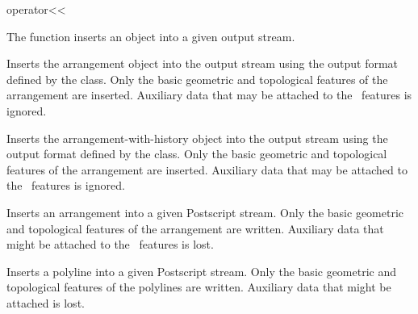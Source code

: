 \ccHtmlNoClassLinks
\begin{ccRefFunction}{operator<<}
\label{ref_arr_operator_leftshift}

\ccDefinition

The function \ccRefName{} inserts an object into a given output stream.



Inserts the arrangement object  into the output stream
 using the output format defined by the
 class. Only the basic geometric and
topological features of the arrangement are inserted. Auxiliary data
that may be attached to the \dcel\ features is ignored.



Inserts the arrangement-with-history object  into the output
stream  using the output format defined by the
 class. Only the basic geometric
and topological features of the arrangement are inserted. Auxiliary
data that may be attached to the \dcel\ features is ignored.


Inserts an arrangement into a given Postscript stream.
Only the basic geometric and topological features of the arrangement are
written. Auxiliary data that might be attached to the \dcel\ features is
lost.




Inserts a polyline into a given Postscript stream.
Only the basic geometric and topological features of the polylines are
written. Auxiliary data that might be attached is lost.
    


\end{ccRefFunction}
